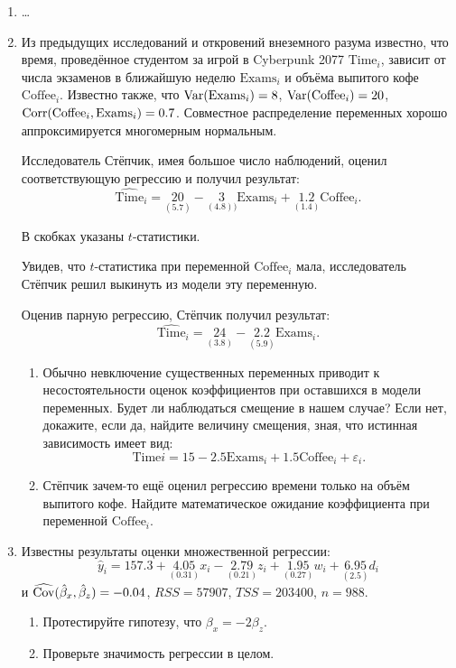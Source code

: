 \begin{enumerate}

    \item \dots
    \item Из предыдущих исследований и откровений внеземного разума известно, что время, 
    проведённое студентом за игрой в Cyberpunk 2077 $\text{Time}_i$, 
    зависит от числа экзаменов в ближайшую неделю $\text{Exams}_i$ и объёма выпитого кофе $\text{Coffee}_i$. 
    Известно также, что $\operatorname{Var}(\text{Exams}_i)=8$, $\operatorname{Var}(\text{Coffee}_i) = 20$, $\operatorname{Corr}(\text{Coffee}_i, \text{Exams}_i)=0.7$.
    Совместное распределение переменных хорошо аппроксимируется многомерным нормальным.
    
    Исследователь Стёпчик, имея большое число наблюдений, оценил соответствующую регрессию и получил результат:
    \[
    \widehat{\text{Time}}_i=\underset{(5.7)}{20}-\underset{(4.8))}{3} \text{Exams}_i+ \underset{(1.4)}{1.2} \text{Coffee}_i.
    \]

    В скобках указаны $t$-статистики.
    
    Увидев, что $t$-статистика при переменной $\text{Coffee}_i$ мала, исследователь Стёпчик решил выкинуть из модели эту переменную.
    
    Оценив парную регрессию, Стёпчик получил результат:
    \[
    \widehat{\text{Time}}_i = \underset{(3.8)}{24} - \underset{(5.9)}{2.2} \text{Exams}_i.
    \]


    \begin{enumerate}
        \item Обычно невключение существенных переменных приводит к несостоятельности оценок коэффициентов при оставшихся в модели переменных. 
        Будет ли наблюдаться смещение в нашем случае? 
        Если нет, докажите, если да, найдите величину смещения, зная, что истинная зависимость имеет вид:
        \[
        \text{Time}i = 15 - 2.5 \text{Exams}_i + 1.5  \text{Coffee}_i + \varepsilon_i.
        \]
        \item Стёпчик зачем-то ещё оценил регрессию времени только на объём выпитого кофе. 
        Найдите математическое ожидание коэффициента при переменной $\text{Coffee}_i$.
    \end{enumerate}
    
    \item Известны результаты оценки множественной регрессии:
    \[
    \hat{y}_i = 157.3 + \underset{(0.31)}{4.05} x_{i} - \underset{(0.21)}{2.79} z_i + \underset{(0.27)}{1.95} w_i + \underset{(2.5)}{6.95} d_{i}
    \]
    и $\operatorname{\widehat{\operatorname{Cov}}}(\hat{\beta}_x, \hat{\beta}_z)=-0.04$, $RSS=57907$, $TSS=203400$, $n=988$.
    \begin{enumerate}
        \item Протестируйте гипотезу, что $\beta_x=-2 \beta_z$.
        \item Проверьте значимость регрессии в целом.
    \end{enumerate}


\end{enumerate}
